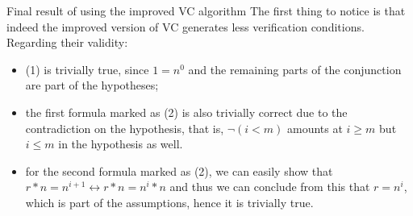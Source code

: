 \documentclass[aspectratio=169]{beamer}
\begin{document}
\begin{slide}{Final result of using the improved VC algorithm}
The first thing to notice is that indeed the improved version of VC generates less verification conditions. Regarding their validity:
\begin{itemize}
\item (1) is trivially true, since $1 = n^0$ and the remaining parts of the conjunction are part of the hypotheses;
\item the first formula marked as (2) is also trivially correct due to the contradiction on the hypothesis, that is, $\neg(i < m)$ amounts at $i \geq m$ but $i \leq m$ in the hypothesis as well.
\item for the second formula marked as (2), we can easily show that $r * n = n^{i+1} \leftrightarrow r * n = n^i * n$ and thus we can conclude from this that $r = n^i$, which is part of the assumptions, hence it is trivially true.  
\end{itemize}
\end{slide}

%
%
\end{document}
